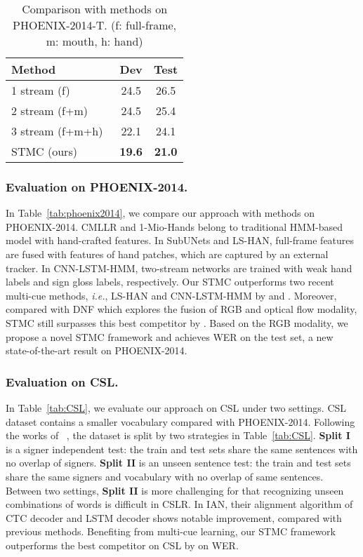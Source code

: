 \documentclass[letterpaper]{article} \usepackage{aaai20}  \usepackage{times}  \usepackage{helvet} \usepackage{courier}  \usepackage[hyphens]{url}  \usepackage{graphicx} \urlstyle{rm} \def\UrlFont{\rm}  \usepackage{graphicx}  \frenchspacing  \setlength{\pdfpagewidth}{8.5in}  \setlength{\pdfpageheight}{11in}
\begin{document}
\begin{table}[tp]
    \centering
    \small
    \caption{Comparison with methods on PHOENIX-2014-T. (f: full-frame, m: mouth, h: hand)} \label{tab:phoenix-2014-t}
    \begin{tabular}{l|c|c}
    \hline
    Method                              & Dev & Test  \\ \hline
    1 stream (f)~\cite{tpami19}         & 24.5    & 26.5      \\
    2 stream (f+m)~\cite{tpami19}       & 24.5    & 25.4      \\
    3 stream (f+m+h)~\cite{tpami19}     & 22.1    & 24.1      \\ \hline
    STMC (ours)                         & \textbf{19.6}     & \textbf{21.0}      \\ \hline
    \end{tabular}
\end{table}


\subsubsection{Evaluation on PHOENIX-2014.} In Table~\ref{tab:phoenix2014}, we compare our approach with methods on PHOENIX-2014. 
CMLLR and 1-Mio-Hands belong to traditional HMM-based model with hand-crafted features. In SubUNets and LS-HAN, full-frame features are fused with features of hand patches, which are captured by an external tracker. In CNN-LSTM-HMM, two-stream networks are trained with weak hand labels and sign gloss labels, respectively. Our STMC outperforms two recent multi-cue methods, \emph{i.e.}, LS-HAN and CNN-LSTM-HMM by  and . Moreover, compared with DNF which explores the fusion of RGB and optical flow modality, STMC still surpasses this best competitor by . Based on the RGB modality, we propose a novel STMC framework and achieves  WER on the test set, a new state-of-the-art result on PHOENIX-2014.

\subsubsection{Evaluation on CSL.} In Table~\ref{tab:CSL}, we evaluate our approach on CSL under two settings. CSL dataset contains a smaller vocabulary compared with PHOENIX-2014. Following the works of ~\cite{han,hlstm}, the dataset is split by two strategies in Table~\ref{tab:CSL}. \textbf{Split I} is a signer independent test: the train and test sets share the same sentences with no overlap of signers. \textbf{Split II} is an unseen sentence test: the train and test sets share the same signers and vocabulary with no overlap of same sentences. Between two settings, \textbf{Split II} is more challenging for that recognizing unseen combinations of words is difficult in CSLR. In IAN, their alignment algorithm of CTC decoder and LSTM decoder shows notable improvement, compared with previous methods. Benefiting from multi-cue learning, our STMC framework outperforms the best competitor on CSL by  on WER.
\end{document}
